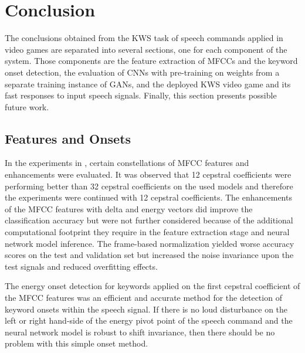 
\chapter{Conclusion}\label{sec:conclusion}
The conclusions obtained from the KWS task of speech commands applied in video games are separated into several sections, one for each component of the system.
Those components are the feature extraction of MFCCs and the keyword onset detection, the evaluation of CNNs with pre-training on weights from a separate training instance of GANs, and the deployed KWS video game and its fast responses to input speech signals.
Finally, this section presents possible future work.



\section{Features and Onsets}
In the experiments in , certain constellations of MFCC features and enhancements were evaluated.
It was observed that 12 cepstral coefficients were performing better than 32 cepstral coefficients on the used models and therefore the experiments were continued with 12 cepstral coefficients.
The enhancements of the MFCC features with delta and energy vectors did improve the classification accuracy but were not further considered because of the additional computational footprint they require in the feature extraction stage and neural network model inference.
The frame-based normalization yielded worse accuracy scores on the test and validation set but increased the noise invariance upon the test signals and reduced overfitting effects.

The energy onset detection for keywords applied on the first cepstral coefficient of the MFCC features was an efficient and accurate method for the detection of keyword onsets within the speech signal.
If there is no loud disturbance on the left or right hand-side of the energy pivot point of the speech command and the neural network model is robust to shift invariance, then there should be no problem with this simple onset method.



